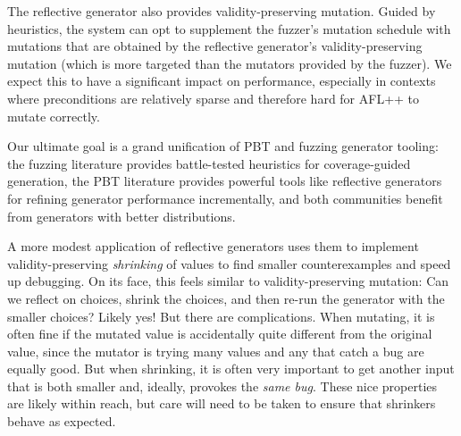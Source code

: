 The reflective generator also provides validity-preserving mutation. Guided by
heuristics, the system can opt to supplement the fuzzer's mutation schedule with
mutations that are obtained by the reflective generator's validity-preserving
mutation (which is more targeted than the mutators provided by the fuzzer). We
expect this to have a significant impact on performance, especially in contexts
where preconditions are relatively sparse and therefore hard for AFL++ to mutate
correctly.

Our ultimate goal is a grand unification of PBT and fuzzing generator tooling:
the fuzzing literature provides battle-tested heuristics for coverage-guided
generation, the PBT literature provides powerful tools like reflective
generators for refining generator performance incrementally, and both
communities benefit from generators with better distributions.

A more modest application of reflective generators uses them to implement
validity-preserving {\em shrinking} of values to find smaller counterexamples
and speed up debugging. On its face, this feels similar to validity-preserving
mutation: Can we reflect on choices, shrink the choices, and then re-run the
generator with the smaller choices? Likely yes! But there are complications.
When mutating, it is often fine if the mutated value is accidentally quite
different from the original value, since the mutator is trying many values and
any that catch a bug are equally good. But when shrinking, it is often very
important to get another input that is both smaller and, ideally, provokes the
{\em same bug}. These nice properties are likely within reach, but care will
need to be taken to ensure that shrinkers behave as expected.

\label{sec:val}

